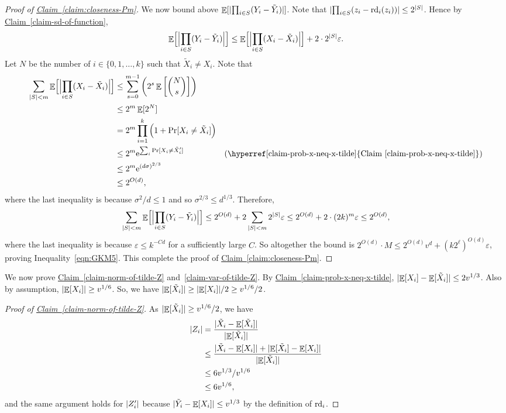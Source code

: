 \documentclass[11pt]{article}
\numberwithin{equation}{section}
\theoremstyle{definition}
\theoremstyle{plain}
\newcommand{\eee}{\mathrm e}
\newcommand{\expref}[2]{\hyperref[#2]{#1~\ref{#2}}}
\def\eps{\varepsilon}
\def\rd{\textnormal{rd}}
\DeclarePairedDelimiter{\abs}{\lvert}{\rvert}
\DeclareMathOperator*{\E}{\mathbb{E}}                 %
\begin{document}
\begin{proof}[Proof of {\expref{Claim}{claim:closeness-Pm}}]
    We now bound above $\E[\abs{\prod_{i \in S} (Y_i - \tilde Y_i)}]$.
    Note that $\abs{ \prod_{i \in S} (z_i - \rd_i(z_i)) } \le 2^{\abs{S}}$.
    Hence by \expref{Claim}{claim-sd-of-function},
    \[
      \E \Bigl[ \Bigl| \prod_{i \in S} ( Y_i - \tilde Y_i ) \Bigr| \Bigr]
      \le \E \Bigl[ \Bigl| \prod_{i \in S} ( X_i - \tilde X_i ) \Bigr| \Bigr] + 2 \cdot 2^{\abs{S}} \eps .
    \]
    Let $N$ be the number of $i \in \{0, 1, \ldots, k\}$ such that $\tilde X_i \neq X_i$.
    Note that
    \begin{align*}
      \sum_{ \abs{S} < m} \E \Bigl[ \Bigl| \prod_{i \in S} ( X_i - \tilde X_i ) \Bigr| \Bigr]
      &\le \sum_{s = 0}^{m-1} \left( 2^s \E\left[ {N \choose s} \right] \right) \\
      &\le 2^m \E[2^N] \\
      &= 2^m \prod_{i = 1}^k \Big( 1 + \Pr[X_i \neq \tilde X_i] \Big) \\
      &\le 2^m \eee^{ \sum_i \Pr[X_i \neq \tilde X_i'] } & \text{(\expref{Claim}{claim-prob-x-neq-x-tilde})} \\
      &\le 2^m \eee^{ (d \sigma)^{2/3} } \\
      &\le 2^{O(d)} ,
    \end{align*}
    where the last inequality is because $\sigma^2/d \le 1$ and so $\sigma^{2/3} \le d^{1/3}$.
    Therefore,
    \[
      \sum_{ \abs{S} < m} \E \Bigl[ \Bigl| \prod_{i \in S} ( Y_i - \tilde Y_i ) \Bigr| \Bigr]
      \le 2^{O(d)} + 2 \sum_{\abs{S} < m} 2^{\abs{S}} \eps
      \le 2^{O(d)} + 2 \cdot (2k)^m \eps
      \le 2^{O(d)} ,
    \]
    where the last inequality is because $\eps \le k^{-Cd}$ for a sufficiently large $C$.
    So altogether the bound is $2^{O(d)} \cdot M \le 2^{O(d)} v^d + (k 2^\ell)^{O(d)} \eps$, proving Inequality~\eqref{eqn:GKM5}.
    This complete the proof of \expref{Claim}{claim:closeness-Pm}.
  \end{proof}

  We now prove \expref{Claim}{claim-norm-of-tilde-Z} and~\ref{claim-var-of-tilde-Z}.
  By \expref{Claim}{claim-prob-x-neq-x-tilde}, $\abs{ \E[X_i] - \E[\tilde X_i] } \le 2 v^{1/3}$.
  Also by assumption, $\abs{\E[X_i]} \ge v^{1/6}$.
  So, we have $\abs{\E[\tilde X_i]} \ge \abs{\E[X_i]}/2 \ge v^{1/6}/2$.

  \begin{proof}[Proof of {\expref{Claim}{claim-norm-of-tilde-Z}}]
    As $\abs{\E[\tilde X_i]} \ge v^{1/6} / 2$, we have
    \begin{align*}
      \abs{Z_i}
      &= \frac{ \abs{ \tilde X_i - \E[\tilde X_i] } }{ \abs{\E[\tilde X_i]} } \\
      &\le \frac{ \abs{ \tilde X_i - \E[X_i]} + \abs{\E[\tilde X_i] - \E[X_i]} }{ \abs{\E[\tilde X_i]} } \\
      &\le 6 v^{1/3} / v^{1/6} \\
      &\le 6 v^{1/6} ,
    \end{align*}
    and the same argument holds for $\abs{Z_i'}$ because $\abs{\tilde Y_i - \E[X_i]} \le v^{1/3}$ by the definition of $\rd_i$.
  \end{proof}
\end{document}

